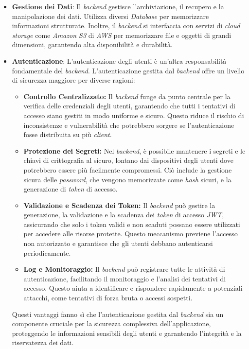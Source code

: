 \begin{itemize}
    \item \textbf{Gestione dei Dati}: Il \textit{backend} gestisce l'archiviazione, il recupero e la manipolazione dei dati.
    Utilizza diversi \textit{Database} per memorizzare informazioni strutturate.
    Inoltre, il \textit{backend} si interfaccia con servizi di \textit{cloud storage} come \textit{Amazon S3} di \textit{AWS} per memorizzare file e oggetti di grandi dimensioni, garantendo alta disponibilità e durabilità.
    \item \textbf{Autenticazione}: L'autenticazione degli utenti è un'altra responsabilità fondamentale del \textit{backend}.
    L'autenticazione gestita dal \textit{backend} offre un livello di sicurezza maggiore per diverse ragioni:
    \begin{itemize}
        \item \textbf{Controllo Centralizzato:} Il \textit{backend} funge da punto centrale per la verifica delle credenziali degli utenti, garantendo che tutti i tentativi di accesso siano gestiti in modo uniforme e sicuro.
        Questo riduce il rischio di inconsistenze e vulnerabilità che potrebbero sorgere se l'autenticazione fosse distribuita su più \textit{client}.
        \item \textbf{Protezione dei Segreti:} Nel \textit{backend}, è possibile mantenere i segreti e le chiavi di crittografia al sicuro, lontano dai dispositivi degli utenti dove potrebbero essere più facilmente compromessi.
        Ciò include la gestione sicura delle \textit{password}, che vengono memorizzate come \textit{hash} sicuri, e la generazione di \textit{token} di accesso.
        \item \textbf{Validazione e Scadenza dei Token:} Il \textit{backend} può gestire la generazione, la validazione e la scadenza dei \textit{token} di accesso \textit{JWT}, assicurando che solo i token validi e non scaduti possano essere utilizzati per accedere alle risorse protette.
        Questo meccanismo previene l'accesso non autorizzato e garantisce che gli utenti debbano autenticarsi periodicamente.
        \item \textbf{Log e Monitoraggio:} Il \textit{backend} può registrare tutte le attività di autenticazione, facilitando il monitoraggio e l'analisi dei tentativi di accesso.
        Questo aiuta a identificare e rispondere rapidamente a potenziali attacchi, come tentativi di forza bruta o accessi sospetti.
    \end{itemize}
    Questi vantaggi fanno sì che l'autenticazione gestita dal \textit{backend} sia un componente cruciale per la sicurezza complessiva dell'applicazione, proteggendo le informazioni sensibili degli utenti e garantendo l'integrità e la riservatezza dei dati.

\end{itemize}
